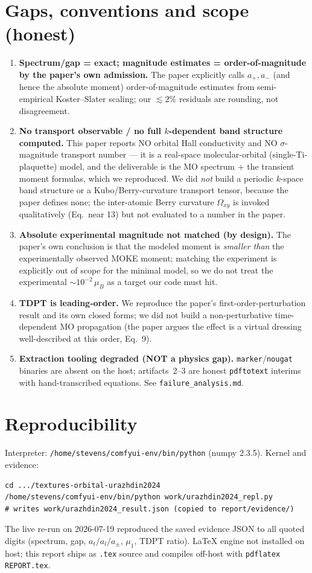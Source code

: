 \documentclass[11pt]{article}
\begin{document}
\section{Gaps, conventions and scope (honest)}
\begin{enumerate}
\item \textbf{Spectrum/gap = exact; magnitude estimates = order-of-magnitude by the paper's own
admission.} The paper explicitly calls $a_+,a_-$ (and hence the absolute moment) order-of-magnitude
estimates from semi-empirical Koster--Slater scaling; our $\lesssim2\%$ residuals are rounding, not
disagreement.
\item \textbf{No transport observable / no full $k$-dependent band structure computed.} This paper
reports NO orbital Hall conductivity and NO $\sigma$-magnitude transport number --- it is a real-space
molecular-orbital (single-Ti-plaquette) model, and the deliverable is the MO spectrum + the transient
moment formulas, which we reproduced. We did \emph{not} build a periodic $k$-space band structure or a
Kubo/Berry-curvature transport tensor, because the paper defines none; the inter-atomic Berry curvature
$\Omega_{xy}$ is invoked qualitatively (Eq.\ near 13) but not evaluated to a number in the paper.
\item \textbf{Absolute experimental magnitude not matched (by design).} The paper's own conclusion is
that the modeled moment is \emph{smaller than} the experimentally observed MOKE moment; matching the
experiment is explicitly out of scope for the minimal model, so we do not treat the experimental
$\sim10^{-2}\,\mu_B$ as a target our code must hit.
\item \textbf{TDPT is leading-order.} We reproduce the paper's first-order-perturbation result and its
own closed forms; we did not build a non-perturbative time-dependent MO propagation (the paper argues
the effect is a virtual dressing well-described at this order, Eq.~9).
\item \textbf{Extraction tooling degraded (NOT a physics gap).} \texttt{marker}/\texttt{nougat} binaries
are absent on the host; artifacts~2--3 are honest \texttt{pdftotext} interims with hand-transcribed
equations. See \texttt{failure\_analysis.md}.
\end{enumerate}

\section{Reproducibility}
Interpreter: \texttt{/home/stevens/comfyui-env/bin/python} (numpy 2.3.5). Kernel and evidence:
\begin{verbatim}
cd .../textures-orbital-urazhdin2024
/home/stevens/comfyui-env/bin/python work/urazhdin2024_repl.py
# writes work/urazhdin2024_result.json (copied to report/evidence/)
\end{verbatim}
The live re-run on 2026-07-19 reproduced the saved evidence JSON to all quoted digits
(spectrum, gap, $a_t/a_l/a_\pm$, $\mu_1$, TDPT ratio). LaTeX engine not installed on host;
this report ships as \texttt{.tex} source and compiles off-host with \texttt{pdflatex REPORT.tex}.
\end{document}
